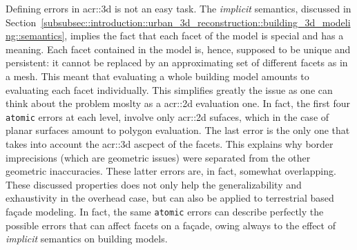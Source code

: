             \begin{figure}[htbp]
                \centering
            \end{figure}

            Defining errors in \gls{acr::3d} is not an easy task.
            The \textit{implicit} semantics, discussed in Section~\ref{subsubsec::introduction::urban_3d_reconstruction::building_3d_modeling::semantics}, implies the fact that each facet of the model is special and has a meaning.
            Each facet contained in the model is, hence, supposed to be unique and persistent: it cannot be replaced by an approximating set of different facets as in a mesh.
            This meant that evaluating a whole building model amounts to evaluating each facet individually.
            This simplifies greatly the issue as one can think about the problem moslty as a \gls{acr::2d} evaluation one.
            In fact, the first four \texttt{atomic} errors at each level, involve only \gls{acr::2d} sufaces, which in the case of planar surfaces amount to polygon evaluation.
            The last error is the only one that takes into account the \gls{acr::3d} ascpect of the facets.
            This explains why border imprecisions (which are geometric issues) were separated from the other geometric inaccuracies.
            These latter errors are, in fact, somewhat overlapping.
            These discussed properties does not only help the generalizability and exhaustivity in the overhead case, but can also be applied to terrestrial based fa\c{c}ade modeling.
            In fact, the same \texttt{atomic} errors can describe perfectly the possible errors that can affect facets on a fa\c{c}ade, owing always to the effect of \textit{implicit} semantics on building models.
        
